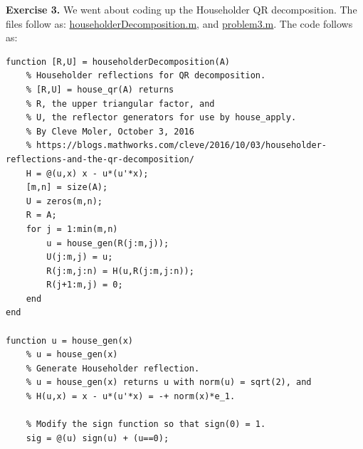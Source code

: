 \documentclass[12pt]{amsart}
\begin{document}
\begin{onehalfspace}
        \textbf{Exercise 3.} We went about coding up the Householder QR decomposition. The files follow as:
        \href{https://github.com/chtompki/MathSpring2026/blob/main/NumericalAnalysis/GuidedLab2/householderDecomposition.m}{householderDecomposition.m}, and
        \href{https://github.com/chtompki/MathSpring2026/blob/main/NumericalAnalysis/GuidedLab2/problem3.m}{problem3.m}.
        The code follows as:
        \begin{tiny}
        \begin{verbatim}
function [R,U] = householderDecomposition(A)
    % Householder reflections for QR decomposition.
    % [R,U] = house_qr(A) returns
    % R, the upper triangular factor, and
    % U, the reflector generators for use by house_apply.
    % By Cleve Moler, October 3, 2016
    % https://blogs.mathworks.com/cleve/2016/10/03/householder-reflections-and-the-qr-decomposition/
    H = @(u,x) x - u*(u'*x);
    [m,n] = size(A);
    U = zeros(m,n);
    R = A;
    for j = 1:min(m,n)
        u = house_gen(R(j:m,j));
        U(j:m,j) = u;
        R(j:m,j:n) = H(u,R(j:m,j:n));
        R(j+1:m,j) = 0;
    end
end

function u = house_gen(x)
    % u = house_gen(x)
    % Generate Householder reflection.
    % u = house_gen(x) returns u with norm(u) = sqrt(2), and
    % H(u,x) = x - u*(u'*x) = -+ norm(x)*e_1.

    % Modify the sign function so that sign(0) = 1.
    sig = @(u) sign(u) + (u==0);


\end{verbatim}
\end{tiny}
\end{onehalfspace}
\end{document}
